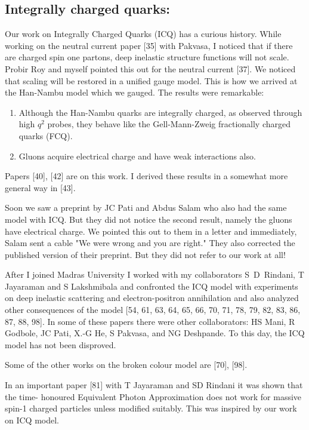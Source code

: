 \subsection*{Integrally charged quarks: }

Our work on Integrally Charged Quarks (ICQ) has a curious history. While 
working on the neutral current paper [35] with Pakvasa, I noticed that 
if there are charged spin one partons, deep inelastic structure 
functions will not scale. Probir Roy and myself pointed this out for the 
neutral current [37]. We noticed that scaling will be restored in a 
unified gauge model. This is how we arrived at the Han-Nambu model which 
we gauged. The results were remarkable:

\begin{enumerate}
\item Although the Han-Nambu quarks are integrally charged, as observed 
through high $q^2$ probes, they behave like the Gell-Mann-Zweig 
fractionally charged quarks (FCQ).
\item Gluons acquire electrical charge and have weak interactions also.
\end{enumerate}

Papers [40], [42] are on this work. I derived these results in a somewhat 
more general way in [43].

Soon we saw a preprint by JC Pati and Abdus Salam who also had the same 
model with ICQ. But they did not notice the second result, namely the 
gluons have electrical charge. We pointed this out to them in a letter 
and immediately, Salam sent a cable "We were wrong and you are right." 
They also corrected the published version of their preprint. But they 
did not refer to our work at all!

After I joined Madras University I worked with my collaborators 
S~D~Rindani, T Jayaraman and S Lakshmibala and confronted the ICQ model with 
experiments on deep inelastic scattering and electron-positron 
annihilation and also analyzed other consequences of the model 
[54, 61, 63, 64, 65, 66, 70, 71, 78, 79, 82, 83, 86, 87, 88, 98]. In some of these 
papers there were other collaborators: HS Mani, R Godbole, JC Pati, X.-G 
He, S Pakvasa, and NG Deshpande. To this day, the ICQ model has not been 
disproved.

Some of the other works on the broken colour model are [70], [98].

In an important paper [81] with T Jayaraman and SD Rindani it was shown 
that the time- honoured Equivalent Photon Approximation does not work 
for massive spin-1 charged particles unless modified suitably. This was 
inspired by our work on ICQ model.

